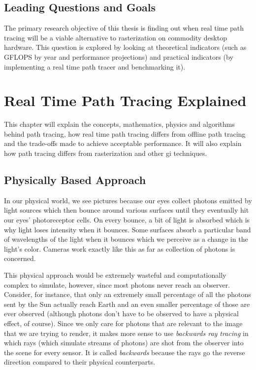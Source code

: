 \documentclass[
  twoside,
  11pt, a4paper,
  footinclude=true,
  headinclude=true,
  cleardoublepage=empty
]{scrreprt}
\begin{document}
\section{Leading Questions and Goals}
The primary research objective of this thesis is finding out when real time path tracing will be a
viable alternative to rasterization on commodity desktop hardware. This question is explored by looking at
theoretical indicators (such as GFLOPS by year and performance projections)
and practical indicators (by implementing a real time
path tracer and benchmarking it).

\chapter{Real Time Path Tracing Explained}
This chapter will explain the concepts, mathematics, physics and algorithms behind path tracing,
how real time path tracing differs from offline path tracing and the trade-offs made to achieve
acceptable performance. It will also explain how path tracing differs from rasterization and other
\ac{gi} techniques.

\section{Physically Based Approach}
In our physical world, we see pictures because our eyes collect photons emitted by light
sources which then bounce around various surfaces until they eventually hit our eyes'
photoreceptor cells. On every bounce, a bit of light is absorbed which is why light loses intensity
when it bounces. Some surfaces absorb a particular band of wavelengths of the light when it bounces
which we perceive as a change in the light's color. Cameras work exactly like this as far as
collection of photons is concerned.

This physical approach would be extremely wasteful and
computationally complex to simulate, however, since most photons never reach an observer. Consider,
for instance, that only an extremely small percentage of all the photons sent by the Sun actually
reach Earth and an even smaller percentage of those are ever observed (although photons
don't have to be observed to have a physical effect, of course). Since we only care for photons that
are relevant to the image that we are trying to render, it makes more sense to use
\emph{backwards ray tracing} in which rays (which simulate streams of photons) are shot from the
observer into the scene for every sensor. It is called \textit{backwards} because the rays go
the reverse direction compared to their physical counterparts.
\end{document}
